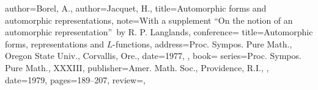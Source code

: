 \documentclass[11pt]{amsart}
\theoremstyle{remark}
\begin{document}
\begin{bibdiv}
\begin{biblist}
    
%    
%    

    {
       author={Borel, A.},
       author={Jacquet, H.},
       title={Automorphic forms and automorphic representations},
       note={With a supplement ``On the notion of an automorphic
       representation''\ by R. P. Langlands},
       conference={
          title={Automorphic forms, representations and $L$-functions},
          address={Proc. Sympos. Pure Math., Oregon State Univ., Corvallis,
          Ore.},
          date={1977},
       },
       book={
          series={Proc. Sympos. Pure Math., XXXIII},
          publisher={Amer. Math. Soc., Providence, R.I.},
       },
       date={1979},
       pages={189--207},
       review={},
    }
 

\end{biblist}
\end{bibdiv}
\end{document}
